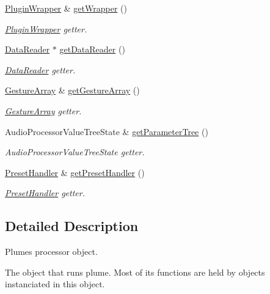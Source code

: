 \begin{DoxyCompactItemize}
\mbox{\hyperlink{class_plugin_wrapper}{Plugin\+Wrapper}} \& \mbox{\hyperlink{class_plume_processor_a6ec4d89f181beea78034b81911c59aa8}{get\+Wrapper}} ()
\begin{DoxyCompactList}\small\item\em \mbox{\hyperlink{class_plugin_wrapper}{Plugin\+Wrapper}} getter. \end{DoxyCompactList}\item 
\mbox{\hyperlink{class_data_reader}{Data\+Reader}} $\ast$ \mbox{\hyperlink{class_plume_processor_ab24c4b6857ca26d462fce6be9e23cedd}{get\+Data\+Reader}} ()
\begin{DoxyCompactList}\small\item\em \mbox{\hyperlink{class_data_reader}{Data\+Reader}} getter. \end{DoxyCompactList}\item 
\mbox{\hyperlink{class_gesture_array}{Gesture\+Array}} \& \mbox{\hyperlink{class_plume_processor_a691a2f342167e257fabf74d0bb76a563}{get\+Gesture\+Array}} ()
\begin{DoxyCompactList}\small\item\em \mbox{\hyperlink{class_gesture_array}{Gesture\+Array}} getter. \end{DoxyCompactList}\item 
Audio\+Processor\+Value\+Tree\+State \& \mbox{\hyperlink{class_plume_processor_a644209f6f5ffcd173b09cc897932bba2}{get\+Parameter\+Tree}} ()
\begin{DoxyCompactList}\small\item\em Audio\+Processor\+Value\+Tree\+State getter. \end{DoxyCompactList}\item 
\mbox{\hyperlink{class_preset_handler}{Preset\+Handler}} \& \mbox{\hyperlink{class_plume_processor_af82034b4fb4b423a61761274d1969f77}{get\+Preset\+Handler}} ()
\begin{DoxyCompactList}\small\item\em \mbox{\hyperlink{class_preset_handler}{Preset\+Handler}} getter. \end{DoxyCompactList}\end{DoxyCompactItemize}


\subsection{Detailed Description}
Plume\textquotesingle{}s processor object. 

The object that runs plume. Most of it\textquotesingle{}s functions are held by objects instanciated in this object. 

